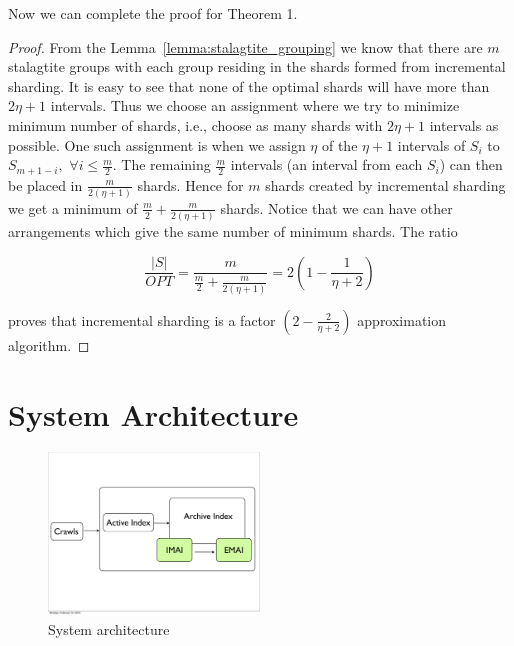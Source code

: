 Now we can complete the proof for Theorem 1.%
\begin{proof}
From the Lemma~\ref{lemma:stalagtite_grouping} we know that there are $m$ stalagtite groups with each group residing in the shards formed from incremental sharding. It is easy to see that none of the optimal shards will have more than $2\eta + 1$ intervals. Thus we choose an assignment where we try to minimize minimum number of shards, i.e., choose as many shards with $2\eta + 1$ intervals as possible. One such assignment is when we assign $\eta$ of the $\eta+1$ intervals of $S_i$ to $S_{m+1-i}, \,\, \forall i \leq \frac{m}{2}$. The remaining $\frac{m}{2}$ intervals (an interval from each $S_i$) can then be placed in $\frac{m}{2(\eta+1)}$ shards. Hence for $m$ shards created by incremental sharding  we get a minimum of $\frac{m}{2} + \frac{m}{2(\eta+1)}$ shards. Notice that we can have other arrangements which give the same number of minimum shards. The ratio 

$$
	\frac{|S|}{OPT} = \frac{m}{\frac{m}{2} + \frac{m}{2(\eta+1)}} 
					= 2 \left(1 - \frac{1}{\eta + 2}\right)
$$

proves that incremental sharding is a factor $(2  -  \frac{2}{\eta+2})$ approximation algorithm.
\end{proof}


\section{System Architecture}
\label{sec:system}

\begin{figure}[tb]
  	\centering
	\includegraphics[width=0.5\textwidth]{resources/system_arch_incsh.pdf}
   	\caption{System architecture}
		  \label{fig:archive_indexing_system}	
\end{figure}

